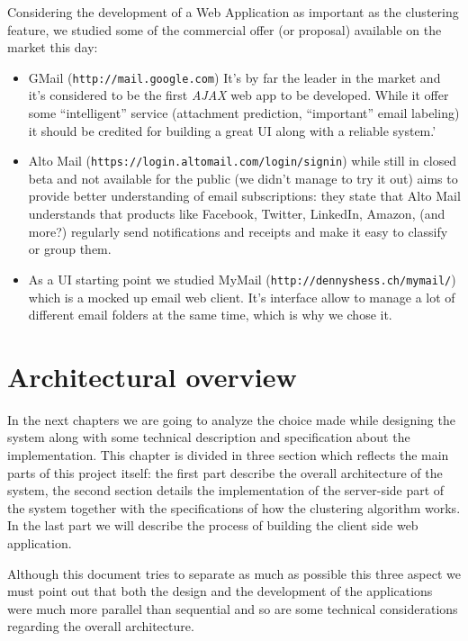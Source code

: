 \documentclass[a4paper,12pt]{report}
\begin{document}
Considering the development of a Web Application as important as the clustering feature, we studied some of the commercial offer (or proposal) available on the market this day:
\begin{itemize}
\item GMail (\texttt{http://mail.google.com}) It's by far the leader in the market and it's considered to be the first \emph{AJAX} web app to be developed. While it offer some ``intelligent'' service (attachment prediction, ``important'' email labeling) it should be credited for building a great UI along with a reliable system.'
\item Alto Mail (\texttt{https://login.altomail.com/login/signin}) while still in closed beta and not available for the public (we didn't manage to try it out) aims to provide better understanding of email subscriptions: they state that Alto Mail understands that products like Facebook, Twitter, LinkedIn, Amazon, (and more?) regularly send notifications and receipts and make it easy to classify or group them. 
\item As a UI starting point we studied MyMail (\texttt{http://dennyshess.ch/mymail/}) which is a mocked up email web client. It's interface allow to manage a lot of different email folders at the same time, which is why we chose it.
\end{itemize}


\chapter{Architectural overview}
In the next chapters we are going to analyze the choice made while designing the system along with some technical description and specification about the implementation. This chapter is divided in three section which reflects the main parts of this project itself: the first part describe the overall architecture of the system, the second section details the implementation of the server-side part of the system together with the specifications of how the clustering algorithm works. In the last part we will describe the process of building the client side web application.

Although this document tries to separate as much as possible this three aspect we must point out that both the design and the development of the applications were much more parallel than sequential and so are some technical considerations regarding the overall architecture.
\end{document}
